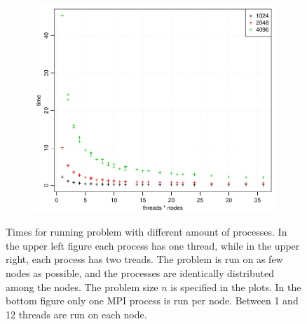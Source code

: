 \begin{figure}[h!]
\begin{subfigure}[b]{0.48\textwidth}
  \end{subfigure}
  \quad
  \begin{subfigure}[b]{0.48\textwidth}
    \includegraphics[width=\textwidth]{./Figures/taskbTimeNodesTimesThreads.pdf}
  \end{subfigure}
  \vspace{1\baselineskip}
  \caption{Times for running problem with different amount of processes. In the upper left figure each process has one thread, while in the upper right, each process has two treads. The problem is run on as few nodes as possible, and the processes are identically distributed among the nodes. The problem size $n$ is specified in the plots. In the bottom figure only one MPI process is run per node. Between 1 and 12 threads are run on each node.}
  \label{fig:time}
\end{figure}
%

